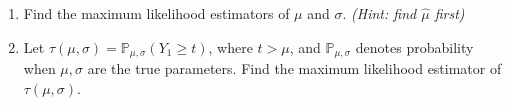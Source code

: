 \documentclass[11pt]{article}
\begin{document}
\begin{enumerate}
\begin{enumerate}
\item Find the maximum likelihood estimators of $\mu$ and $\sigma$. \textit{(Hint: find $\widehat{\mu}$ first)}

\item Let $\tau(\mu, \sigma) = \mathbb{P}_{\mu, \sigma}(Y_1 \geq t)$, where $t > \mu$, and $\mathbb{P}_{\mu, \sigma}$ denotes probability when $\mu, \sigma$ are the true parameters. Find the maximum likelihood estimator of $\tau(\mu, \sigma)$.
\end{enumerate}
\end{enumerate}
\end{document}

